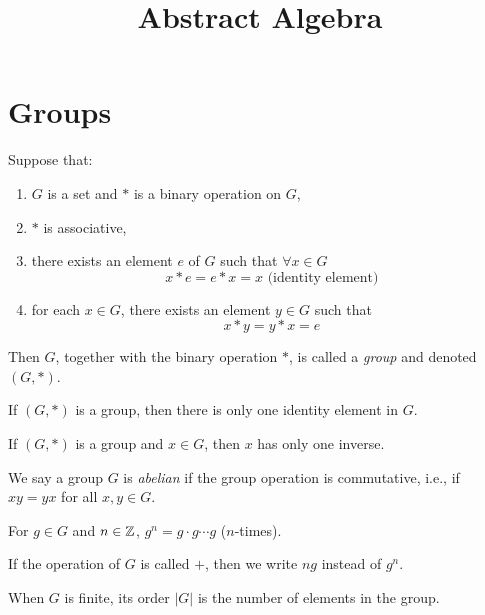 \documentclass{amsart}
\title{Abstract Algebra}
\begin{document}
\maketitle

\section*{Groups}

\begin{definition}
	Suppose that:
	\begin{enumerate}
		\item $G$ is a set and $*$ is a binary operation on $G$,
		\item $*$ is associative,
		\item there exists an element $e$ of $G$ such that $\forall x \in G$ \[x
			* e = e * x = x \text{ (identity element)}\]
		\item for each $x \in G$, there exists an element $y \in G$ such that
			\[x * y = y * x = e\]
	\end{enumerate}
	Then $G$, together with the binary operation $*$, is called a
	\emph{group} and denoted $(G, *)$.
\end{definition}

\begin{theorem}
	If $(G, *)$ is a group, then there is only one identity element in $G$.
\end{theorem}

\begin{theorem}
	If $(G, *)$ is a group and $x \in G$, then $x$ has only one inverse.
\end{theorem}

\begin{definition}
	We say a group $G$ is \emph{abelian} if the group operation is commutative,
	i.e., if $xy = yx$ for all $x, y \in G$.
\end{definition}

\begin{notation}
	For $g \in G$ and $n \in {\mathbb{Z}}$, $g^n = g \cdot g \cdots g$ ($n$-times).
\end{notation}

\begin{notation}
	If the operation of $G$ is called $+$, then we write $ng$ instead of $g^n$.
\end{notation}

\begin{notation}
	When $G$ is finite, its order $|G|$ is the number of elements in the group.
\end{notation}
\end{document}
